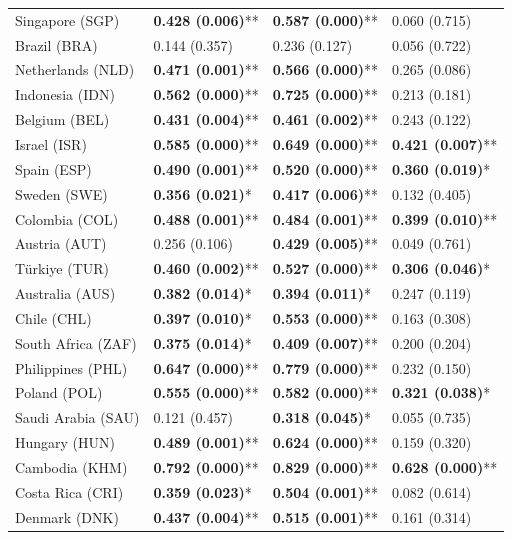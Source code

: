 \begin{longtable}{p{4cm}p{3cm}p{3cm}p{3cm}}
Singapore (SGP) & \textbf{0.428 (0.006)}** & \textbf{0.587 (0.000)}** & 0.060 (0.715) \\
Brazil (BRA) & 0.144 (0.357) & 0.236 (0.127) & 0.056 (0.722) \\
Netherlands (NLD) & \textbf{0.471 (0.001)}** & \textbf{0.566 (0.000)}** & 0.265 (0.086) \\
Indonesia (IDN) & \textbf{0.562 (0.000)}** & \textbf{0.725 (0.000)}** & 0.213 (0.181) \\
Belgium (BEL) & \textbf{0.431 (0.004)}** & \textbf{0.461 (0.002)}** & 0.243 (0.122) \\
Israel (ISR) & \textbf{0.585 (0.000)}** & \textbf{0.649 (0.000)}** & \textbf{0.421 (0.007)}** \\
Spain (ESP) & \textbf{0.490 (0.001)}** & \textbf{0.520 (0.000)}** & \textbf{0.360 (0.019)}* \\
Sweden (SWE) & \textbf{0.356 (0.021)}* & \textbf{0.417 (0.006)}** & 0.132 (0.405) \\
Colombia (COL) & \textbf{0.488 (0.001)}** & \textbf{0.484 (0.001)}** & \textbf{0.399 (0.010)}** \\
Austria (AUT) & 0.256 (0.106) & \textbf{0.429 (0.005)}** & 0.049 (0.761) \\
Türkiye (TUR) & \textbf{0.460 (0.002)}** & \textbf{0.527 (0.000)}** & \textbf{0.306 (0.046)}* \\
Australia (AUS) & \textbf{0.382 (0.014)}* & \textbf{0.394 (0.011)}* & 0.247 (0.119) \\
Chile (CHL) & \textbf{0.397 (0.010)}* & \textbf{0.553 (0.000)}** & 0.163 (0.308) \\
South Africa (ZAF) & \textbf{0.375 (0.014)}* & \textbf{0.409 (0.007)}** & 0.200 (0.204) \\
Philippines (PHL) & \textbf{0.647 (0.000)}** & \textbf{0.779 (0.000)}** & 0.232 (0.150) \\
Poland (POL) & \textbf{0.555 (0.000)}** & \textbf{0.582 (0.000)}** & \textbf{0.321 (0.038)}* \\
Saudi Arabia (SAU) & 0.121 (0.457) & \textbf{0.318 (0.045)}* & 0.055 (0.735) \\
Hungary (HUN) & \textbf{0.489 (0.001)}** & \textbf{0.624 (0.000)}** & 0.159 (0.320) \\
Cambodia (KHM) & \textbf{0.792 (0.000)}** & \textbf{0.829 (0.000)}** & \textbf{0.628 (0.000)}** \\
Costa Rica (CRI) & \textbf{0.359 (0.023)}* & \textbf{0.504 (0.001)}** & 0.082 (0.614) \\
Denmark (DNK) & \textbf{0.437 (0.004)}** & \textbf{0.515 (0.001)}** & 0.161 (0.314) \\

\end{longtable}
